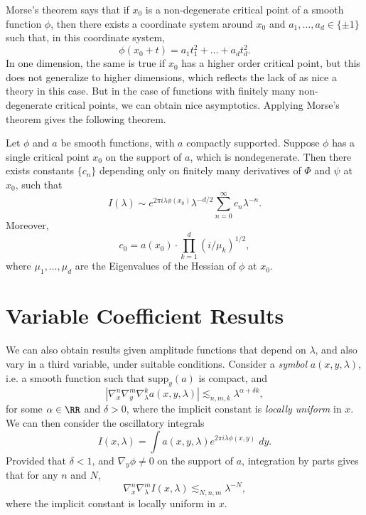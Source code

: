 Morse's theorem says that if $x_0$ is a non-degenerate critical point of a smooth function $\phi$, then there exists a coordinate system around $x_0$ and $a_1, \dots, a_d \in \{ \pm 1 \}$ such that, in this coordinate system,
%
\[ \phi(x_0 + t) = a_1 t_1^2 + \dots + a_d t_d^2. \]
%
In one dimension, the same is true if $x_0$ has a higher order critical point, but this does not generalize to higher dimensions, which reflects the lack of as nice a theory in this case. But in the case of functions with finitely many non-degenerate critical points, we can obtain nice asymptotics. Applying Morse's theorem gives the following theorem.

\begin{theorem}
  Let $\phi$ and $a$ be smooth functions, with $a$ compactly supported. Suppose $\phi$ has a single critical point $x_0$ on the support of $a$, which is nondegenerate. Then there exists constants $\{ c_n \}$ depending only on finitely many derivatives of $\Phi$ and $\psi$ at $x_0$, such that
  \[ I(\lambda) \sim e^{2 \pi i \lambda \phi(x_0)} \lambda^{-d/2} \sum_{n = 0}^\infty c_n \lambda^{-n}. \]
  Moreover,
  \[ c_0 = a(x_0) \cdot \prod_{k = 1}^d (i/\mu_k)^{1/2}, \]
  where $\mu_1,\dots,\mu_d$ are the Eigenvalues of the Hessian of $\phi$ at $x_0$.
\end{theorem}

\section{Variable Coefficient Results}

We can also obtain results given amplitude functions that depend on $\lambda$, and also vary in a third variable, under suitable conditions. Consider a \emph{symbol} $a(x,y,\lambda)$, i.e. a smooth function such that $\text{supp}_y(a)$ is compact, and
%
\[ \left| \nabla_x^n \nabla_y^m \nabla_\lambda^k a(x,y,\lambda) \right| \lesssim_{n,m,k} \lambda^{\alpha + \delta k}, \]
%
for some $\alpha \in \RR$ and $\delta > 0$, where the implicit constant is \emph{locally uniform} in $x$. We can then consider the oscillatory integrals
%
\[ I(x,\lambda) = \int a(x,y,\lambda) e^{2 \pi i \lambda \phi(x,y)}\; dy. \]
%
Provided that $\delta < 1$, and $\nabla_y \phi \neq 0$ on the support of $a$, integration by parts gives that for any $n$ and $N$,
%
\[ \nabla_x^n \nabla_\lambda^m I (x,\lambda) \lesssim_{N,n,m} \lambda^{-N}, \]
%
where the implicit constant is locally uniform in $x$.

